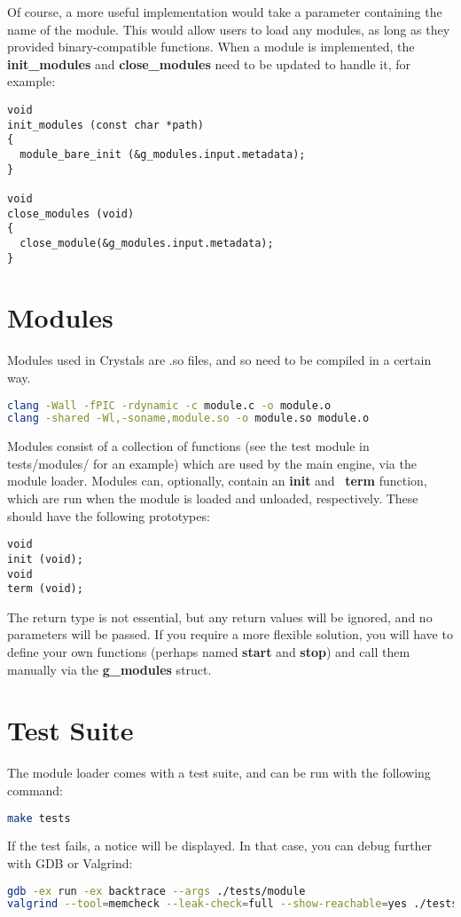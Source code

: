 \documentclass[12pt,a4paper]{article}
\begin{document}
Of course, a more useful implementation would take a parameter containing the name of the module. This would allow users to load any modules, as long as they provided binary-compatible functions. When a module is implemented, the \textbf{init\_modules} and \textbf{close\_modules} need to be updated to handle it, for example:

\begin{lstlisting}
void
init_modules (const char *path)
{
  module_bare_init (&g_modules.input.metadata);
}

void
close_modules (void)
{
  close_module(&g_modules.input.metadata);
}
\end{lstlisting}

\section{Modules}

Modules used in Crystals are .so files, and so need to be compiled in a certain way.

\begin{lstlisting}[language=bash]
clang -Wall -fPIC -rdynamic -c module.c -o module.o
clang -shared -Wl,-soname,module.so -o module.so module.o
\end{lstlisting}

Modules consist of a collection of functions (see the test module in tests/modules/ for an example) which are used by the main engine, via the module loader. Modules can, optionally, contain an \textbf{init} and \ \textbf{term} function, which are run when the module is loaded and unloaded, respectively. These should have the following prototypes:

\begin{lstlisting}
void
init (void);
void
term (void);
\end{lstlisting}

The return type is not essential, but any return values will be ignored, and no parameters will be passed. If you require a more flexible solution, you will have to define your own functions (perhaps named \textbf{start} and \textbf{stop}) and call them manually via the \textbf{g\_modules} struct.

\section{Test Suite}

The module loader comes with a test suite, and can be run with the following command:

\begin{lstlisting}[language=bash]
make tests
\end{lstlisting}

If the test fails, a notice will be displayed. In that case, you can debug further with GDB or Valgrind:

\begin{lstlisting}[language=bash]
gdb -ex run -ex backtrace --args ./tests/module
valgrind --tool=memcheck --leak-check=full --show-reachable=yes ./tests/module
\end{lstlisting}
\end{document}
